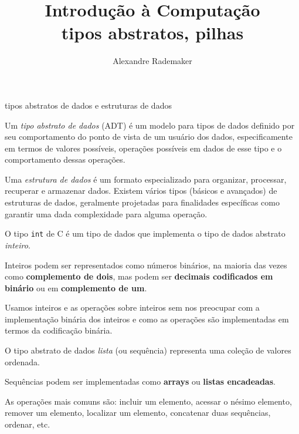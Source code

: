 \documentclass{beamer}
\title{Introdução à Computação \\ tipos abstratos, pilhas}
\author{Alexandre Rademaker}
\date{}
\begin{document}
\begin{frame}
 \maketitle
\end{frame}

\begin{frame}[allowframebreaks]{tipos abstratos de dados e estruturas de dados}

  Um \emph{tipo abstrato de dados} (ADT) é um modelo para tipos de
  dados definido por seu comportamento do ponto de vista de um usuário
  dos dados, especificamente em termos de valores possíveis, operações
  possíveis em dados de esse tipo e o comportamento dessas operações.

  Uma \emph{estrutura de dados} é um formato especializado para
  organizar, processar, recuperar e armazenar dados. Existem vários
  tipos (básicos e avançados) de estruturas de dados, geralmente
  projetadas para finalidades específicas como garantir uma dada
  complexidade para alguma operação.

  \framebreak

  O tipo \texttt{int} de C é um tipo de dados que implementa o tipo de
  dados abstrato \emph{inteiro}.

  Inteiros podem ser representados como números binários, na maioria
  das vezes como \textbf{complemento de dois}, mas podem ser
  \textbf{decimais codificados em binário} ou em \textbf{complemento
    de um}.

  Usamos inteiros e as operações sobre inteiros sem nos preocupar com
  a implementação binária dos inteiros e como as operações são
  implementadas em termos da codificação binária.

  \framebreak

  O tipo abstrato de dados \emph{lista} (ou sequência) representa uma
  coleção de valores ordenada.

  Sequências podem ser implementadas como \textbf{arrays} ou
  \textbf{listas encadeadas}.

  As operações mais comuns são: incluir um elemento, acessar o nésimo
  elemento, remover um elemento, localizar um elemento, concatenar
  duas sequências, ordenar, etc.
  
\end{frame}
\end{document}
